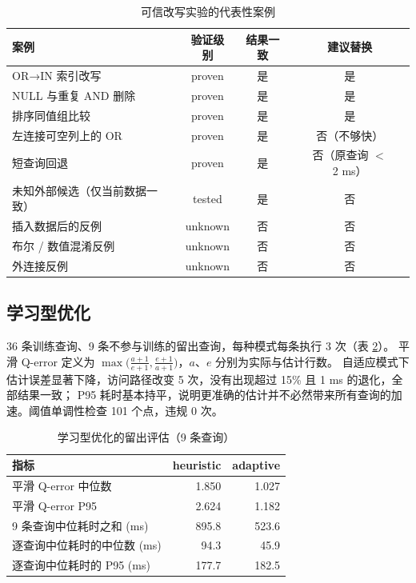 \documentclass[a4paper,zihao=-4,UTF8,fontset=windows,linespread=1.35]{ctexart}
\begin{document}
\begin{table}[!htb]
\centering\small
\caption{可信改写实验的代表性案例}\label{tab:opt}
\begin{tabular}{lccc}
\toprule
案例 & 验证级别 & 结果一致 & 建议替换 \\
\midrule
OR→IN 索引改写 & proven & 是 & 是 \\
NULL 与重复 AND 删除 & proven & 是 & 是 \\
排序同值组比较 & proven & 是 & 是 \\
左连接可空列上的 OR & proven & 是 & 否（不够快） \\
短查询回退 & proven & 是 & 否（原查询 $<$ 2 ms） \\
未知外部候选（仅当前数据一致） & tested & 是 & 否 \\
插入数据后的反例 & unknown & 否 & 否 \\
布尔 / 数值混淆反例 & unknown & 否 & 否 \\
外连接反例 & unknown & 否 & 否 \\
\bottomrule
\end{tabular}
\end{table}

\subsection{学习型优化}
36 条训练查询、9 条不参与训练的留出查询，每种模式每条执行 3 次（表 \ref{tab:learn}）。
平滑 Q-error 定义为 $\max\bigl(\tfrac{a+1}{e+1}, \tfrac{e+1}{a+1}\bigr)$，$a$、$e$ 分别为实际与估计行数。
自适应模式下估计误差显著下降，访问路径改变 5 次，没有出现超过 15\% 且 1 ms 的退化，全部结果一致；
P95 耗时基本持平，说明更准确的估计并不必然带来所有查询的加速。阈值单调性检查 101 个点，违规 0 次。

\begin{table}[!htb]
\centering\small
\caption{学习型优化的留出评估（9 条查询）}\label{tab:learn}
\begin{tabular}{lrr}
\toprule
指标 & heuristic & adaptive \\
\midrule
平滑 Q-error 中位数 & 1.850 & 1.027 \\
平滑 Q-error P95 & 2.624 & 1.182 \\
9 条查询中位耗时之和 (ms) & 895.8 & 523.6 \\
逐查询中位耗时的中位数 (ms) & 94.3 & 45.9 \\
逐查询中位耗时的 P95 (ms) & 177.7 & 182.5 \\
\bottomrule
\end{tabular}
\end{table}
\end{document}
